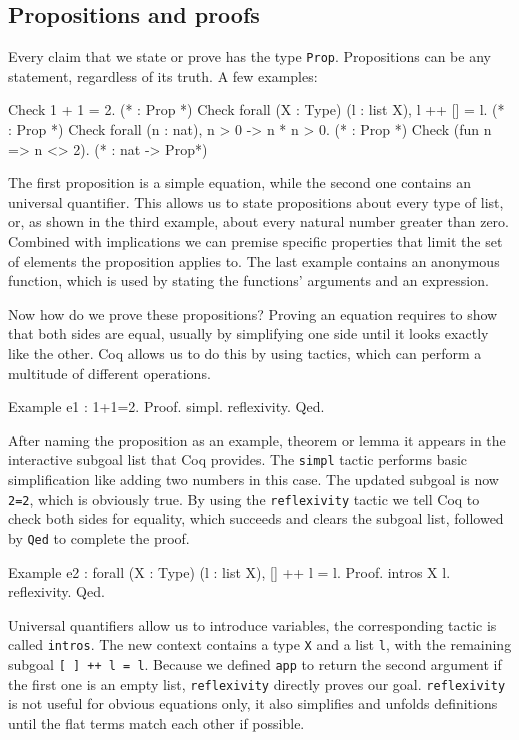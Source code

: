 \documentclass[paper = a4, fleqn, abstract=on, twoside]{scrreprt}
\newcommand{\todo}[1]{\marginpar{\textbf{TODO:} #1}}
\newcommand{\coqinline}[1]{\texttt{#1}}
\begin{document}
\subsection{Propositions and proofs}
Every claim that we state or prove has the type \coqinline{Prop}. Propositions can be any statement, regardless of its truth. A few examples:
\begin{coqcode}
Check 1 + 1 = 2. (* : Prop *)
Check forall (X : Type) (l : list X), l ++ [] = l. (* : Prop *)
Check forall (n : nat), n > 0 -> n * n > 0. (* : Prop *)
Check (fun n => n <> 2). (* : nat -> Prop*)
\end{coqcode}
The first proposition is a simple equation, while the second one contains an universal quantifier. This allows us to state propositions about every type of list, or, as shown in the third example, about every natural number greater than zero. Combined with implications we can premise specific properties that limit the set of elements the proposition applies to. The last example contains an anonymous function, which is used by stating the functions' arguments and an expression.
\par
Now how do we prove these propositions? Proving an equation requires to show that both sides are equal, usually by simplifying one side until it looks exactly like the other. Coq allows us to do this by using tactics, which can perform a multitude of different operations.
\begin{coqcode}
Example e1 : 1+1=2.
Proof. simpl. reflexivity. Qed. 
\end{coqcode} 
\todo{Highlighting für Proof und Qed}
After naming the proposition as an example, theorem or lemma it appears in the interactive subgoal list that Coq provides. The \coqinline{simpl} tactic performs basic simplification like adding two numbers in this case. The updated subgoal is now \coqinline{2=2}, which is obviously true. By using the \coqinline{reflexivity} tactic we tell Coq to check both sides for equality, which succeeds and clears the subgoal list, followed by \coqinline{Qed} to complete the proof.
\begin{coqcode}
Example e2 : forall (X : Type) (l : list X), [] ++ l = l.
Proof. intros X l. reflexivity. Qed.
\end{coqcode}
Universal quantifiers allow us to introduce variables, the corresponding tactic is called \coqinline{intros}. The new context contains a type \coqinline{X} and a list \coqinline{l}, with the remaining subgoal \coqinline{[ ] ++ l = l}. Because we defined \coqinline{app} to return the second argument if the first one is an empty list, \coqinline{reflexivity} directly proves our goal. \coqinline{reflexivity} is not useful for obvious equations only, it also simplifies and unfolds definitions until the flat terms match each other if possible.
\end{document}
